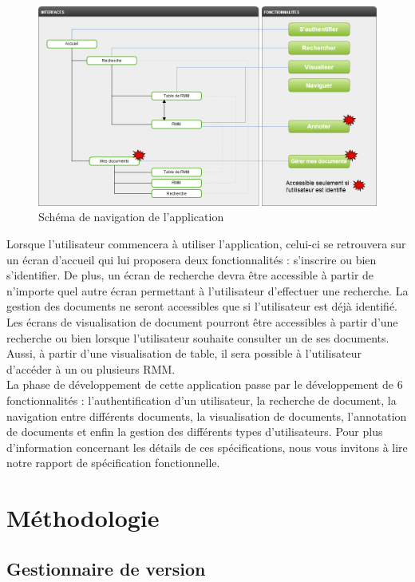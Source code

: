 \documentclass[a4paper]{article}
\begin{document}
\begin{figure}[H]
\centering
\includegraphics[width=\textwidth]{navigation.png}
\caption{Schéma de navigation de l'application}
\label{fig:navigation}
\end{figure}

	Lorsque l’utilisateur commencera à utiliser l’application, celui-ci se retrouvera sur un écran d’accueil qui lui proposera deux fonctionnalités : s'inscrire ou bien s’identifier. De plus, un écran de recherche devra être accessible à partir de n’importe quel autre écran permettant à l'utilisateur d'effectuer une recherche. La gestion des documents ne seront accessibles que si l’utilisateur est déjà identifié. Les écrans de visualisation de document pourront être accessibles à partir d’une recherche ou bien lorsque l’utilisateur souhaite consulter un de ses documents. Aussi, à partir d’une visualisation de table, il sera possible à l’utilisateur d’accéder à un ou plusieurs RMM.\\
	
	La phase de développement de cette application passe par le développement de 6 fonctionnalités : l'authentification d'un utilisateur, la recherche de document, la navigation entre différents documents, la visualisation de documents, l'annotation de documents et enfin la gestion des différents types d'utilisateurs. Pour plus d'information concernant les détails de ces spécifications, nous vous invitons à lire notre rapport de spécification fonctionnelle.\\
	
\section{Méthodologie}

	\subsection{Gestionnaire de version}
\end{document}
